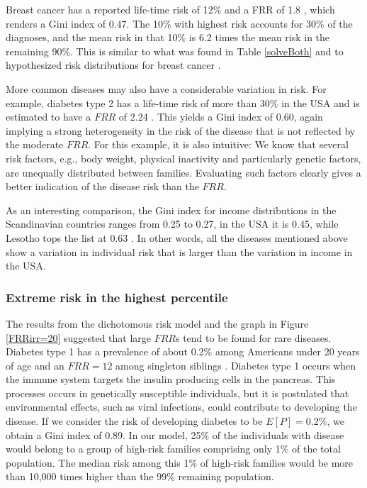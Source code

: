\documentclass{bmcart}
\begin{document}
Breast cancer has a reported life-time risk of 12\% and a FRR of 1.8 \cite{desantis2016breast,collaborative2001familial}, which renders a Gini index of 0.47. The 10\% with highest risk accounts for 30\% of the diagnoses, and the mean risk in that 10\% is 6.2 times the mean risk in the remaining 90\%. This is similar to what was found in Table \ref{solveBoth} and to hypothesized risk distributions for breast cancer \cite{balmain2003genetics,chatterjee2016developing}. 

More common diseases may also have a considerable variation in risk. For example, diabetes type 2 has a life-time risk of more than $30\%$ in the USA \cite{narayan2003lifetime} and is estimated to have a $FRR$ of 2.24 \cite{weires2007familiality}. This yields a Gini index of 0.60, again implying a strong heterogeneity in the risk of the disease that is not reflected by the moderate $FRR$. For this example, it is also intuitive: We know that several risk factors, e.g., body weight, physical inactivity and particularly genetic factors, are unequally distributed between families. Evaluating such factors clearly gives a better indication of the disease risk than the $FRR$.

As an interesting comparison, the Gini index for income distributions in the Scandinavian countries ranges from 0.25 to 0.27, in the USA it is 0.45, while Lesotho tops the list at 0.63 \cite{cia}. In other words, all the diseases mentioned above show a variation in individual risk that is larger than the variation in income in the USA. 

\subsubsection*{Extreme risk in the highest percentile}
The results from the dichotomous risk model and the graph in Figure \ref{FRRirr=20} suggested that large $FRR$s tend to be found for rare diseases. Diabetes type 1 has a prevalence of about 0.2\% among Americans under 20 years of age and an $FRR=12$ among singleton siblings \cite{hemminki2009familial}. Diabetes type 1 occurs when the immune system targets the insulin producing cells in the pancreas. This processes occurs in genetically susceptible individuals, but it is postulated that environmental effects, such as viral infections, could contribute to developing the disease. If we consider the risk of developing diabetes to be $E[P] = 0.2\%$, we obtain a Gini index of 0.89. In our model, 25\% of the individuals with disease would belong to a group of high-risk families comprising only 1\% of the total population. The median risk among this 1\% of high-risk families would be more than 10,000 times higher than the 99\% remaining population.
\end{document}

